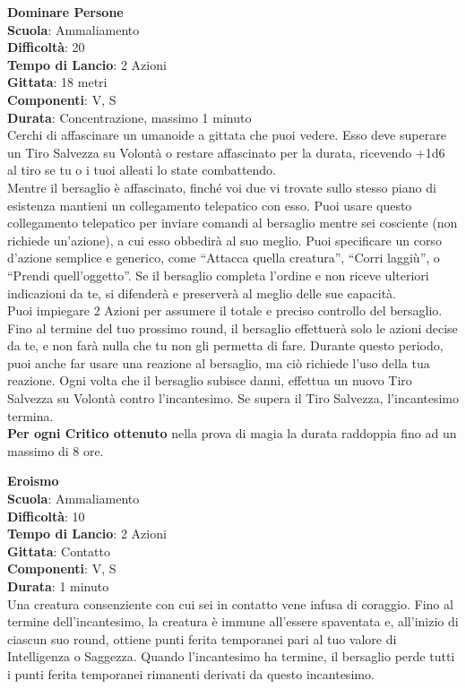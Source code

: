\begin{multicols}{2}
\medskip\textbf{Dominare Persone}\\
\textbf{Scuola}: Ammaliamento\\
\textbf{Difficoltà}:  20\\
\textbf{Tempo di Lancio}: 2 Azioni\\
\textbf{Gittata}: 18 metri\\
\textbf{Componenti}: V, S\\
\textbf{Durata}: Concentrazione, massimo 1 minuto\\
Cerchi di affascinare un umanoide a gittata che puoi vedere. Esso deve superare un Tiro Salvezza su Volontà o restare affascinato per la durata, ricevendo +1d6 al tiro se tu o i tuoi alleati lo state combattendo.\\
Mentre il bersaglio è affascinato, finché voi due vi trovate sullo stesso piano di esistenza mantieni un collegamento telepatico con esso. Puoi usare questo collegamento telepatico per inviare comandi al bersaglio mentre sei cosciente (non richiede un'azione), a cui esso obbedirà al suo meglio. Puoi specificare un corso d’azione semplice e generico, come “Attacca quella creatura”, “Corri laggiù”, o “Prendi quell'oggetto”. Se il bersaglio completa l’ordine e non riceve ulteriori indicazioni da te, si difenderà e preserverà al meglio delle sue capacità.\\
Puoi impiegare 2 Azioni per assumere il totale e preciso controllo del bersaglio. Fino al termine del tuo prossimo round, il bersaglio effettuerà solo le azioni decise da te, e non farà nulla che tu non gli permetta di fare. Durante questo periodo, puoi anche far usare una reazione al bersaglio, ma ciò richiede l’uso della tua reazione. Ogni volta che il bersaglio subisce danni, effettua un nuovo Tiro Salvezza su Volontà contro l'incantesimo. Se supera il Tiro Salvezza, l'incantesimo termina.\\
\textbf{Per ogni Critico ottenuto} nella prova di magia la durata raddoppia fino ad un massimo di 8 ore.

\medskip\textbf{Eroismo}\\
\textbf{Scuola}: Ammaliamento\\
\textbf{Difficoltà}:  10\\
\textbf{Tempo di Lancio}: 2 Azioni\\
\textbf{Gittata}: Contatto\\
\textbf{Componenti}: V, S\\
\textbf{Durata}: 1 minuto\\
Una creatura consenziente con cui sei in contatto vene infusa di coraggio. Fino al termine dell'incantesimo, la creatura è immune all'essere spaventata e, all'inizio di ciascun suo round, ottiene punti ferita temporanei pari al tuo valore di Intelligenza o Saggezza. Quando l'incantesimo ha termine, il bersaglio perde tutti  i punti ferita temporanei rimanenti derivati da questo
incantesimo.


\end{multicols}
